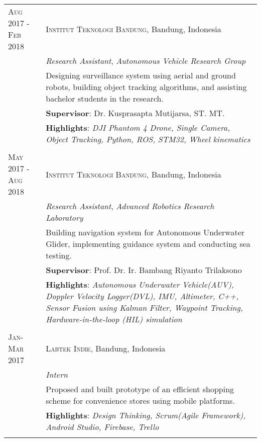 \documentclass[a4paper,10pt]{article} %
\begin{document}
\begin{tabular}{lp{12cm}}
\textsc{Aug 2017 -  Feb 2018} & \textsc{Institut Teknologi Bandung}, Bandung, Indonesia \\
& \emph{Research Assistant}, \textit{Autonomous Vehicle Research Group}\\ 
& \footnotesize{Designing surveillance system using aerial and ground robots, building object tracking algorithms, and assisting bachelor students in the research.}\\
& \footnotesize{\textbf{Supervisor}: Dr. Kusprasapta Mutijarsa, ST. MT.}\\
& \footnotesize{\textbf{Highlights}: \textit{DJI Phantom 4 Drone, Single Camera, Object Tracking, Python, ROS, STM32, Wheel kinematics}}\\
\multicolumn{2}{c}{} \\


\textsc{May 2017 - Aug 2018} & \textsc{Institut Teknologi Bandung}, Bandung, Indonesia \\
& \emph{Research Assistant}, \textit{Advanced Robotics Research Laboratory}\\ 
& \footnotesize{Building navigation system for Autonomous Underwater Glider, implementing guidance system and conducting sea testing.}\\
& \footnotesize{\textbf{Supervisor}: Prof. Dr. Ir. Bambang Riyanto Trilaksono}\\
& \footnotesize{\textbf{Highlights}: \textit{Autonomous Underwater Vehicle(AUV), Doppler Velocity Logger(DVL), IMU, Altimeter, C++, Sensor Fusion using Kalman Filter, Waypoint Tracking, Hardware-in-the-loop (HIL) simulation}}\\
\multicolumn{2}{c}{} \\


\textsc{Jan-Mar 2017} & \textsc{Labtek Indie}, Bandung, Indonesia \\
& \emph{Intern}\\ 
& \footnotesize{Proposed and built prototype of an efficient shopping scheme for convenience stores using mobile platforms.}\\
& \footnotesize{\textbf{Highlights}: \textit{Design Thinking, Scrum(Agile Framework), Android Studio, Firebase, Trello}}\\
\multicolumn{2}{c}{} \\


\end{tabular}
\end{document}
